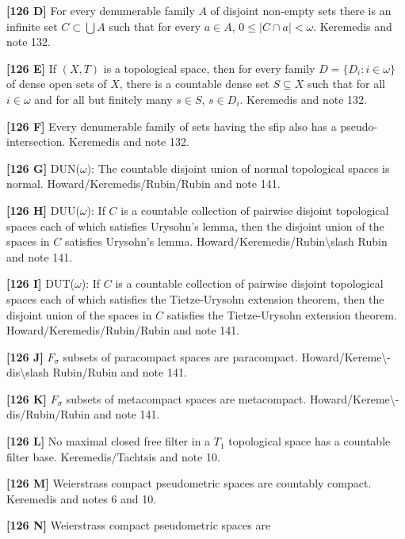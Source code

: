 \smallskip
\item{}{\bf [126 D]} For every denumerable family $A$ of disjoint non-empty
sets there is an infinite set $C\subset\bigcup A$ such that for every
$a\in A$, $0\le|C\cap a|<\omega$. \ac{Keremedis} \cite{1999a} and note 132.
\smallskip
\item{}{\bf [126 E]} If $(X,T)$ is a topological space, then for every
family $D=\{D_i: i\in\omega\}$ of dense open sets of
$X$, there is a countable dense set $S\subseteq X$ such that for all
$i\in\omega$ and for all but finitely many $s\in S$, $s\in D_i$.
\ac{Keremedis} \cite{1999a} and note 132.
\smallskip
\item{}{\bf [126 F]} Every denumerable family of sets having
the sfip also has a pseudo-intersection. \ac{Keremedis} \cite{1999a} and
note 132.
\smallskip
\item{}{\bf [126 G]} DUN($\omega$): The countable disjoint union of
normal topological spaces is normal.
\ac{Howard/Keremedis/Rubin/Rubin} \cite{1998a} and note 141.
\smallskip
\item{}{\bf [126 H]} DUU($\omega$): If $C$ is a countable collection
of pairwise disjoint topological spaces each of which satisfies
Urysohn's lemma, then the disjoint union of the
spaces in $C$ satisfies Urysohn's lemma.
\ac{Howard/Keremedis/Rubin\slash Rubin} \cite{1998a} and note 141.
\smallskip
\item{}{\bf [126 I]} DUT($\omega$): If $C$ is a countable collection
of pairwise disjoint topological spaces each of which satisfies
the Tietze-Urysohn extension theorem, then the disjoint union
of the spaces in $C$ satisfies the Tietze-Urysohn extension theorem.
\ac{Howard/Keremedis/Rubin/Rubin} \cite{1998a} and note 141.
\smallskip
\item{}{\bf [126 J]} $F_\sigma$ subsets of paracompact spaces are
paracompact. \ac{Howard/Kereme\-dis\slash Rubin/Rubin} \cite{1997b} and
note 141.
\smallskip
\item{}{\bf [126 K]} $F_\sigma$ subsets of metacompact spaces are
metacompact. \ac{Howard/Kereme\-dis/Rubin/Rubin} \cite{1997b} and
note 141.
\smallskip
\item{}{\bf [126 L]} No maximal closed free filter in a $T_1$
topological space has a countable filter base. \ac{Keremedis/Tachtsis}
\cite{1999b} and note 10.
\smallskip
\item{}{\bf [126 M]} Weierstrass compact pseudometric spaces are
countably compact.  \ac{Keremedis} \cite{1999a} and notes 6 and
10.
\smallskip
\item{}{\bf [126 N]} Weierstrass compact pseudometric spaces are
